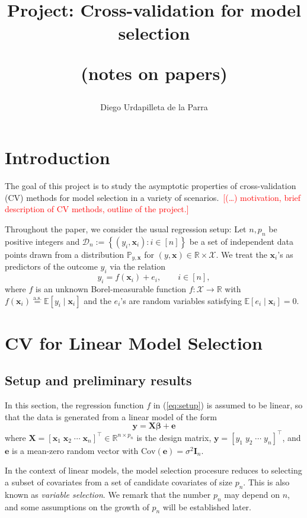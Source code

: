 \documentclass[12pt, letter paper]{article}
\title{Project: Cross-validation for model selection

(notes on papers)}
\author{Diego Urdapilleta de la Parra}
\newcommand{\1}{\mathmybb{1}}
\newcommand{\R}{\mathbb{R}}
\newcommand{\0}{\emptyset}
\newcommand{\prob}{\mathbb{P}}
\newcommand{\Ep}[1]{\mathbb{E}\left[ #1 \right]}
\newcommand{\paren}[1]{\left(#1 \right)}
\newcommand{\sqbr}[1]{\left[#1 \right]}
\newcommand{\set}[1]{\left\{ #1 \right\}}
\newcommand{\data}{\mathcal{D}_{n}}
\newcommand{\aseq}{\stackrel{\mathrm{a.s.}}{=}}
\newcommand{\X}{\boldsymbol{X}}
\newcommand{\x}{\boldsymbol{x}}
\newcommand{\y}{\boldsymbol{y}}
\newcommand{\e}{\boldsymbol{e}}
\newcommand{\Cov}[1]{\mathrm{Cov}\paren{#1}}
\newcommand{\bbeta}{\boldsymbol{\beta}}
\begin{document}
\maketitle
\tableofcontents

\newpage
\section{Introduction}

The goal of this project is to study the asymptotic properties of cross-validation (CV) methods for model selection in a variety of scenarios.~\textcolor{red}{[(\ldots) motivation, brief description of CV methods, outline of the project.]}

Throughout the paper, we consider the usual regression setup: Let \(n,p_{n}\) be positive integers and \(\data := \set{\paren{y_{i}, \x_{i}}:i\in [n]}\) be a set of independent data points drawn from a distribution \(\prob_{y, \x}\) for \((y, \x)\in\R\times \mathcal{X}\). We treat the \(\x_{i}\)'s as predictors of the outcome \(y_{i}\) via the relation
\begin{equation}\label{eq:setup}
    y_{i} = f(\x_{i}) + e_{i},\qquad i\in[n],
\end{equation}
where \(f\) is an unknown Borel-measurable function \(f:\mathcal{X}\to\R\) with \(f(\x_i)\aseq \Ep{y_i\mid \x_i}\) and the \(e_{i}\)'s are random variables satisfying \(\Ep{e_i\mid\x_{i}} = 0\).


\newpage
\section{CV for Linear Model Selection}
\subsection{Setup and preliminary results}
In this section, the regression function \(f\) in (\ref{eq:setup}) is assumed to be linear, so that the data is generated from a linear model of the form
\[\y = \X\bbeta + \e\]
where \(\X = {[\x_{1}\;\x_{2}\;\cdots\;\x_{n}]}^{\top}\in\R^{n\times p_{n}}\) is the design matrix, \(\y = \sqbr{y_{1}\; y_{2}\;\cdots\; y_{n}}^{\top}\), and \(\e\) is a mean-zero random vector with \(\Cov{\e} = \sigma^{2}\boldsymbol{I}_{n}\).

In the context of linear models, the model selection procesure reduces to selecting a subset of covariates from a set of candidate covariates of size \(p_n\). This is also known as \emph{variable selection}. We remark that the number \(p_n\) may depend on \(n\), and some assumptions on the growth of \(p_n\) will be established later.
\end{document}
